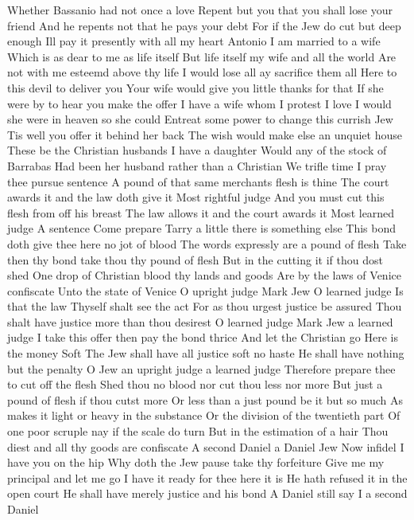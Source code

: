 Whether Bassanio had not once a love 
Repent but you that you shall lose your friend 
And he repents not that he pays your debt 
For if the Jew do cut but deep enough 
Ill pay it presently with all my heart 
Antonio I am married to a wife 
Which is as dear to me as life itself 
But life itself my wife and all the world 
Are not with me esteemd above thy life 
I would lose all ay sacrifice them all 
Here to this devil to deliver you 
Your wife would give you little thanks for that 
If she were by to hear you make the offer 
I have a wife whom I protest I love 
I would she were in heaven so she could 
Entreat some power to change this currish Jew 
Tis well you offer it behind her back 
The wish would make else an unquiet house 
These be the Christian husbands I have a daughter 
Would any of the stock of Barrabas 
Had been her husband rather than a Christian 
We trifle time I pray thee pursue sentence 
A pound of that same merchants flesh is thine 
The court awards it and the law doth give it 
Most rightful judge 
And you must cut this flesh from off his breast 
The law allows it and the court awards it 
Most learned judge A sentence Come prepare 
Tarry a little there is something else 
This bond doth give thee here no jot of blood 
The words expressly are a pound of flesh 
Take then thy bond take thou thy pound of flesh 
But in the cutting it if thou dost shed 
One drop of Christian blood thy lands and goods 
Are by the laws of Venice confiscate 
Unto the state of Venice 
O upright judge Mark Jew O learned judge 
Is that the law 
Thyself shalt see the act 
For as thou urgest justice be assured 
Thou shalt have justice more than thou desirest 
O learned judge Mark Jew a learned judge 
I take this offer then pay the bond thrice 
And let the Christian go 
Here is the money 
Soft 
The Jew shall have all justice soft no haste 
He shall have nothing but the penalty 
O Jew an upright judge a learned judge 
Therefore prepare thee to cut off the flesh 
Shed thou no blood nor cut thou less nor more 
But just a pound of flesh if thou cutst more 
Or less than a just pound be it but so much 
As makes it light or heavy in the substance 
Or the division of the twentieth part 
Of one poor scruple nay if the scale do turn 
But in the estimation of a hair 
Thou diest and all thy goods are confiscate 
A second Daniel a Daniel Jew 
Now infidel I have you on the hip 
Why doth the Jew pause take thy forfeiture 
Give me my principal and let me go 
I have it ready for thee here it is 
He hath refused it in the open court 
He shall have merely justice and his bond 
A Daniel still say I a second Daniel 
